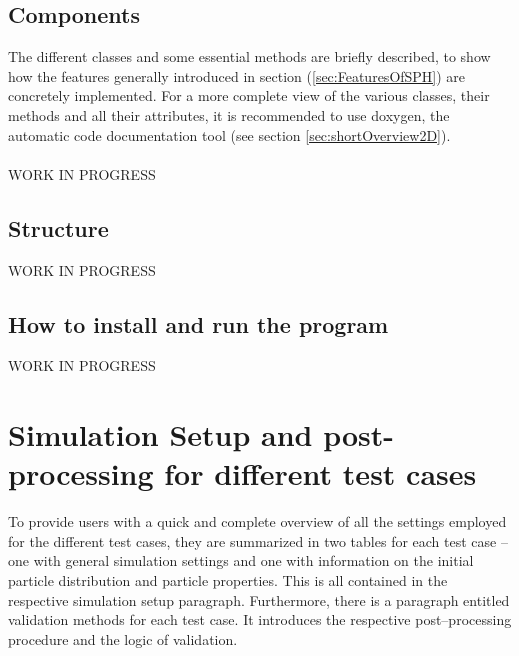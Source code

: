 \documentclass{report}
\begin{document}
\subsection{Components}
\label{sec:Comp2DCode}
The different classes and some essential methods are briefly described, to show how the  features generally introduced in section (\ref{sec:FeaturesOfSPH}) are concretely implemented. For a more complete view of the various classes, their methods and all their attributes, it is recommended to use doxygen, the automatic code documentation tool (see section \ref{sec:shortOverview2D}).
\\
\\
WORK IN PROGRESS



\subsection{Structure}
\label{sec:Struc2DCode}

WORK IN PROGRESS

%

\subsection{How to install and run the program}
\label{sec:HowToInstAndRun2D}

WORK IN PROGRESS


\section{Simulation Setup and post-processing for different test cases}
\label{sec:simuSetupTestCases}
To provide users with a quick and complete overview of all the settings employed for the different test cases, they are summarized in two tables for each test case -- one with general simulation settings and one with information on the initial particle distribution and particle properties. This is all contained in the respective simulation setup paragraph. 
Furthermore, there is a paragraph entitled validation methods for each test case. It introduces the respective post--processing procedure and the logic of validation. 
\end{document}
